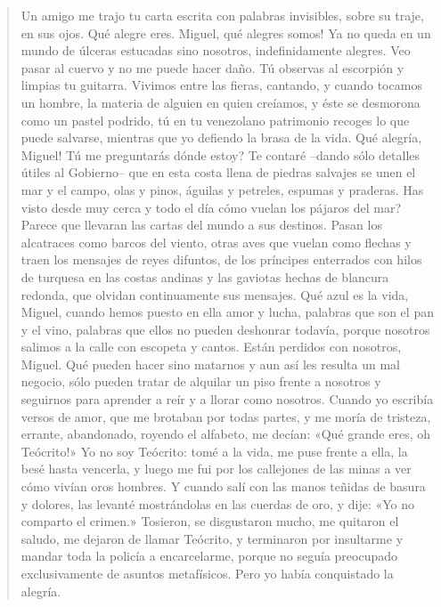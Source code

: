 \documentclass[12pt]{article}
\begin{document}
\clearpage
{}
\begin{verse}
Un amigo me trajo tu carta escrita  
con palabras invisibles, sobre su traje, en sus ojos.  
Qué alegre eres. Miguel, qué alegres somos!  
Ya no queda en un mundo de úlceras estucadas  
sino nosotros, indefinidamente alegres.  
Veo pasar al cuervo y no me puede hacer daño.  
Tú observas al escorpión y limpias tu guitarra.  
Vivimos entre las fieras, cantando, y cuando tocamos  
un hombre, la materia de alguien en quien creíamos,  
y éste se desmorona como un pastel podrido,  
tú en tu venezolano patrimonio recoges  
lo que puede salvarse, mientras que yo defiendo  
la brasa de la vida.  
	Qué alegría, Miguel!  
Tú me preguntarás dónde estoy? Te contaré  
--dando sólo detalles útiles al Gobierno--  
que en esta costa llena de piedras salvajes  
se unen el mar y el campo, olas y pinos,  
águilas y petreles, espumas y praderas.  
Has visto desde muy cerca y todo el día  
cómo vuelan los pájaros del mar? Parece  
que llevaran las cartas del mundo a sus destinos.  
Pasan los alcatraces como barcos del viento,  
otras aves que vuelan como flechas y traen  
los mensajes de reyes difuntos, de los príncipes  
enterrados con hilos de turquesa en las costas andinas  
y las gaviotas hechas de blancura redonda,  
que olvidan continuamente sus mensajes.  
Qué azul es la vida, Miguel, cuando hemos puesto en ella  
amor y lucha, palabras que son el pan y el vino,  
palabras que ellos no pueden deshonrar todavía,  
porque nosotros salimos a la calle con escopeta y cantos.  
Están perdidos con nosotros, Miguel.  
Qué pueden hacer sino matarnos y aun así  
les resulta un mal negocio, sólo pueden  
tratar de alquilar un piso frente a nosotros y seguirnos  
para aprender a reír y a llorar como nosotros.  
Cuando yo escribía versos de amor, que me brotaban  
por todas partes, y me moría de tristeza,  
errante, abandonado, royendo el alfabeto,  
me decían: «Qué grande eres, oh Teócrito!»  
Yo no soy Teócrito: tomé a la vida,  
me puse frente a ella, la besé hasta vencerla,  
y luego me fui por los callejones de las minas  
a ver cómo vivían oros hombres.  
Y cuando salí con las manos teñidas de basura y dolores,  
las levanté mostrándolas en las cuerdas de oro,  
y dije: «Yo no comparto el crimen.»  
Tosieron, se disgustaron mucho, me quitaron el saludo,  
me dejaron de llamar Teócrito, y terminaron  
por insultarme y mandar toda la policía a encarcelarme,  
porque no seguía preocupado exclusivamente de asuntos metafísicos.  
Pero yo había conquistado la alegría.  

\end{verse}
\end{document}
